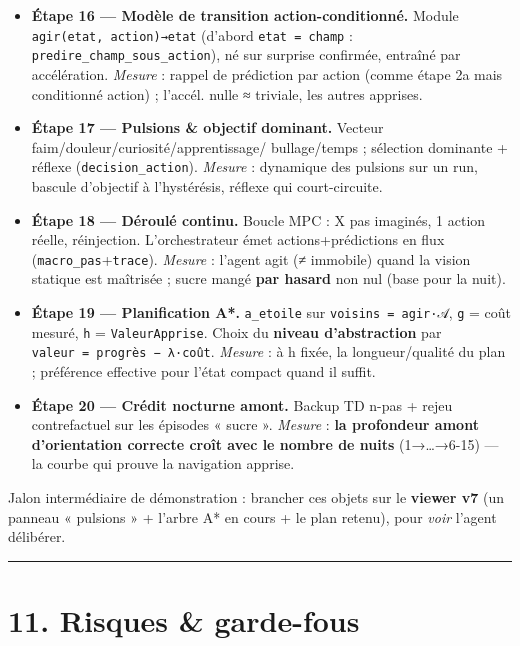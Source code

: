 \documentclass[
  french,
  11pt,
]{article}
\providecommand{\tightlist}{%
  \setlength{\itemsep}{0pt}\setlength{\parskip}{0pt}}
\begin{document}
\begin{itemize}
\tightlist
\item
  \textbf{Étape 16 --- Modèle de transition action-conditionné.} Module
  \texttt{agir(etat,\ action)→etat} (d'abord \texttt{etat\ =\ champ} :
  \texttt{predire\_champ\_sous\_action}), né sur surprise confirmée,
  entraîné par accélération. \emph{Mesure} : rappel de prédiction par
  action (comme étape 2a mais conditionné action) ; l'accél. nulle ≈
  triviale, les autres apprises.
\item
  \textbf{Étape 17 --- Pulsions \& objectif dominant.} Vecteur
  faim/douleur/curiosité/apprentissage/ bullage/temps ; sélection
  dominante + réflexe (\texttt{decision\_action}). \emph{Mesure} :
  dynamique des pulsions sur un run, bascule d'objectif à l'hystérésis,
  réflexe qui court-circuite.
\item
  \textbf{Étape 18 --- Déroulé continu.} Boucle MPC : X pas imaginés, 1
  action réelle, réinjection. L'orchestrateur émet actions+prédictions
  en flux (\texttt{macro\_pas}+\texttt{trace}). \emph{Mesure} : l'agent
  agit (≠ immobile) quand la vision statique est maîtrisée ; sucre mangé
  \textbf{par hasard} non nul (base pour la nuit).
\item
  \textbf{Étape 19 --- Planification A*.} \texttt{a\_etoile} sur
  \texttt{voisins\ =\ agir·𝒜}, \texttt{g} = coût mesuré, \texttt{h} =
  \texttt{ValeurApprise}. Choix du \textbf{niveau d'abstraction} par
  \texttt{valeur\ =\ progrès\ −\ λ·coût}. \emph{Mesure} : à h fixée, la
  longueur/qualité du plan ; préférence effective pour l'état compact
  quand il suffit.
\item
  \textbf{Étape 20 --- Crédit nocturne amont.} Backup TD n-pas + rejeu
  contrefactuel sur les épisodes « sucre ». \emph{Mesure} : \textbf{la
  profondeur amont d'orientation correcte croît avec le nombre de nuits}
  (1→\ldots→6-15) --- la courbe qui prouve la navigation apprise.
\end{itemize}

Jalon intermédiaire de démonstration : brancher ces objets sur le
\textbf{viewer v7} (un panneau « pulsions » + l'arbre A* en cours + le
plan retenu), pour \emph{voir} l'agent délibérer.

\begin{center}\rule{0.5\linewidth}{0.5pt}\end{center}

\section{11. Risques \& garde-fous}\label{risques-garde-fous}
\end{document}

